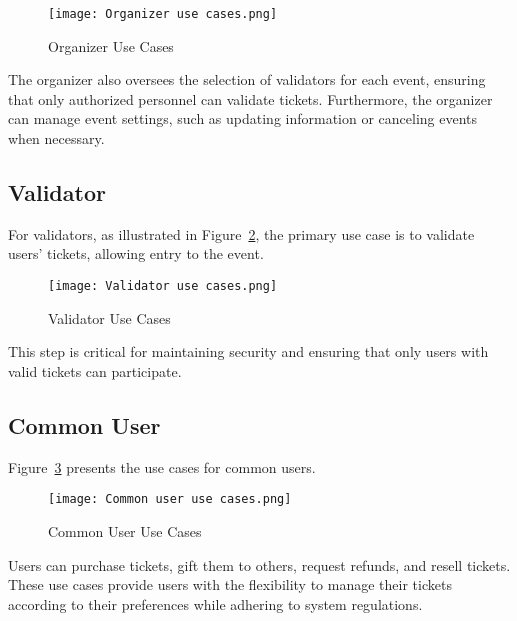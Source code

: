 \begin{figure}[H]
    \centering
    \texttt{[image: Organizer use cases.png]}
    \caption{Organizer Use Cases}
    \label{fig:organizer_use_cases}
\end{figure}

The organizer also oversees the selection of validators for each event,
ensuring that only authorized personnel can validate tickets. Furthermore, the
organizer can manage event settings, such as updating information or canceling
events when necessary.

\subsection{Validator}
\label{subsec:validator}

For validators, as illustrated in Figure~\ref{fig:validator_use_cases}, the
primary use case is to validate users' tickets, allowing entry to the event.

\begin{figure}[H]
    \centering
    \texttt{[image: Validator use cases.png]}
    \caption{Validator Use Cases}
    \label{fig:validator_use_cases}
\end{figure}

This step is critical for maintaining security and ensuring that only users
with valid tickets can participate.

\subsection{Common User}
\label{subsec:common_user}

Figure~\ref{fig:common_user_use_cases} presents the use cases for common users.

\begin{figure}[H]
    \centering
    \texttt{[image: Common user use cases.png]}
    \caption{Common User Use Cases}
    \label{fig:common_user_use_cases}
\end{figure}

Users can purchase tickets, gift them to others, request refunds, and resell
tickets. These use cases provide users with the flexibility to manage their
tickets according to their preferences while adhering to system regulations.
